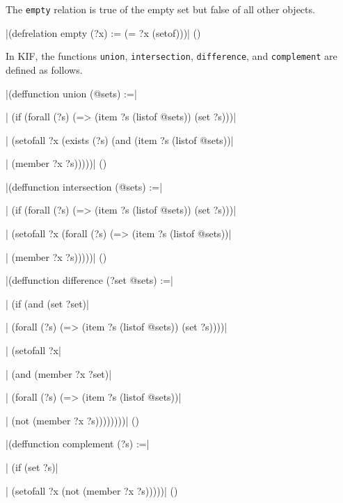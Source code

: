 The {\tt empty} relation is true of the empty set but false of all other
objects.

\medskip
\verbatim|(defrelation empty (?x) := (= ?x (setof)))|
\hfill(\equation)\par
\medskip

In KIF, the functions {\tt union}, {\tt intersection}, {\tt difference}, and
{\tt complement} are defined as follows.


\medskip
\verbatim|(deffunction union (@sets) :=|\par
\verbatim|  (if (forall (?s) (=> (item ?s (listof @sets)) (set ?s)))|\par
\verbatim|      (setofall ?x (exists (?s) (and (item ?s (listof @sets))|\par
\verbatim|                                     (member ?x ?s)))))| 
\hfill(\equation)\par
\medskip

\medskip
\verbatim|(deffunction intersection (@sets) :=|\par
\verbatim|  (if (forall (?s) (=> (item ?s (listof @sets)) (set ?s)))|\par
\verbatim|      (setofall ?x (forall (?s) (=> (item ?s (listof @sets))|\par
\verbatim|                                    (member ?x ?s)))))| 
\hfill(\equation)\par

\medskip
\verbatim|(deffunction difference (?set @sets) :=|\par
\verbatim|  (if (and (set ?set)|\par
\verbatim|           (forall (?s) (=> (item ?s (listof @sets)) (set ?s))))|\par
\verbatim|      (setofall ?x|\par
\verbatim|                (and (member ?x ?set)|\par
\verbatim|                     (forall (?s) (=> (item ?s (listof @sets))|\par
\verbatim|                                      (not (member ?x ?s))))))))|
\hfill(\equation)\par
\medskip

\medskip
\verbatim|(deffunction complement (?s) :=|\par
\verbatim|  (if (set ?s)|\par
\verbatim|      (setofall ?x (not (member ?x ?s)))))|
\hfill(\equation)\par
\medskip

